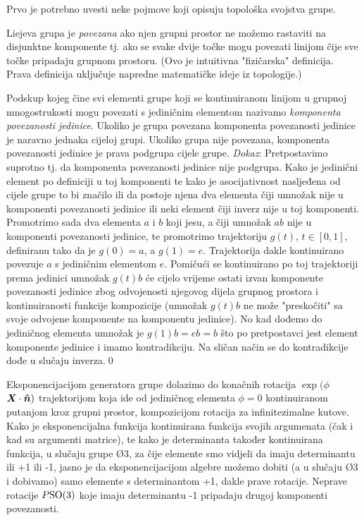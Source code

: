 Prvo je potrebno uvesti neke pojmove koji opisuju topološka
svojstva grupe.
\begin{definicija}[Povezanost]
Liejeva grupa je \emph{povezana} ako njen grupni prostor ne možemo
rastaviti na disjunktne komponente tj. ako se svake dvije točke 
mogu povezati linijom čije sve točke pripadaju grupnom prostoru.
(Ovo je intuitivna "fizičarska" definicija. Prava definicija uključuje napredne
matematičke ideje iz topologije.)
\label{def:povezanost}
\end{definicija}
Podskup kojeg čine svi elementi grupe koji se
kontinuiranom linijom u grupnoj mnogostrukosti mogu povezati s
jediničnim elementom nazivamo \emph{komponenta povezanosti jedinice}.
Ukoliko je grupa povezana komponenta povezanosti jedinice je naravno
jednaka cijeloj grupi. Ukoliko grupa nije povezana, komponenta povezanosti
jedinice je prava podgrupa cijele grupe. \emph{Dokaz}: Pretpostavimo
suprotno tj. da komponenta povezanosti jedinice nije podgrupa. Kako je
jedinični element po definiciji u toj komponenti te kako je asocijativnost
nasljeđena od cijele grupe to bi značilo ili da postoje njena dva elementa čiji
umnožak nije u komponenti povezanosti jedinice ili neki element čiji inverz nije u 
toj komponenti.
Promotrimo sada dva elementa $a$ i $b$ koji jesu, a čiji umnožak $ab$ nije u komponenti
povezanosti jedinice, te promotrimo trajektoriju $g(t)$, $t\in[0,1]$,
definiranu tako da je $g(0)=a$, a $g(1)=e$. Trajektorija dakle
kontinuirano povezuje $a$ s jediničnim elementom $e$.
Pomičući se kontinuirano po toj trajektoriji prema jedinici
umnožak $g(t)b$ će cijelo vrijeme ostati izvan komponente povezanosti jedinice
zbog odvojenosti njegovog dijela grupnog prostora i kontinuiranosti
funkcije kompozicije (umnožak $g(t)b$ ne može "preskočiti" sa svoje odvojene
komponente na komponentu jedinice). No kad dođemo do jediničnog elementa
umnožak je $g(1)b = eb = b$ što po pretpostavci jest element komponente jedinice
i imamo kontradikciju. Na sličan način se do kontradikcije dođe u slučaju inverza.\qed

Eksponencijacijom generatora grupe  dolazimo do konačnih rotacija
$\exp(\phi$ $\vec{X}\cdot\unitn)$ trajektorijom koja ide od jediničnog
elementa $\phi=0$ kontinuiranom putanjom kroz grupni prostor, kompozicijom rotacija za
infinitezimalne kutove. Kako je eksponencijalna funkcija kontinuirana
funkcija svojih argumenata (čak i kad su argumenti matrice), te kako
je determinanta također kontinuirana funkcija, u slučaju grupe \O{3},
za čije elemente smo vidjeli da imaju determinantu ili +1 ili -1,
jasno je da eksponencijacijom algebre možemo dobiti (a u slučaju \O{3}
i dobivamo) samo elemente s determinantom +1, dakle prave rotacije.
Neprave rotacije $P\mathrm{SO}(3)$ koje imaju determinantu -1
pripadaju drugoj komponenti povezanosti. \label{pag:povezanostO3}



